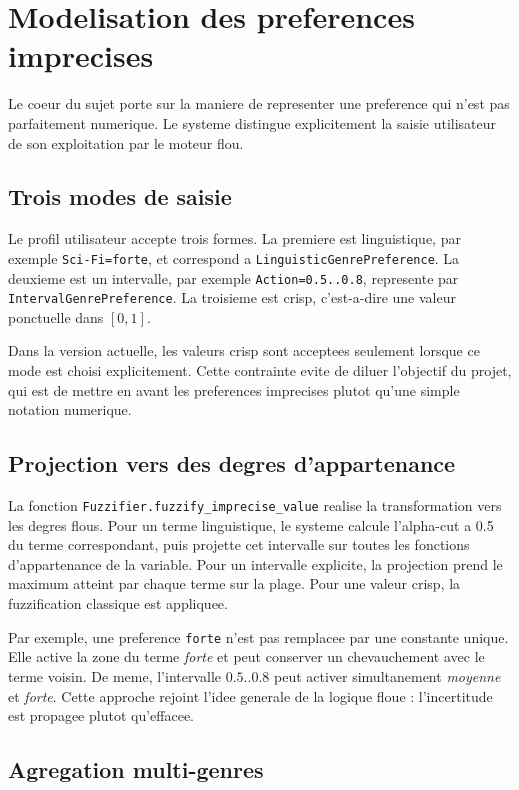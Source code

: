 \section{Modelisation des preferences imprecises}

Le coeur du sujet porte sur la maniere de representer une preference qui n'est pas parfaitement numerique. Le systeme distingue explicitement la saisie utilisateur de son exploitation par le moteur flou.

\subsection{Trois modes de saisie}

Le profil utilisateur accepte trois formes. La premiere est linguistique, par exemple \texttt{Sci-Fi=forte}, et correspond a \texttt{LinguisticGenrePreference}. La deuxieme est un intervalle, par exemple \texttt{Action=0.5..0.8}, represente par \texttt{IntervalGenrePreference}. La troisieme est crisp, c'est-a-dire une valeur ponctuelle dans $[0,1]$.

Dans la version actuelle, les valeurs crisp sont acceptees seulement lorsque ce mode est choisi explicitement. Cette contrainte evite de diluer l'objectif du projet, qui est de mettre en avant les preferences imprecises plutot qu'une simple notation numerique.

\subsection{Projection vers des degres d'appartenance}

La fonction \texttt{Fuzzifier.fuzzify\_imprecise\_value} realise la transformation vers les degres flous. Pour un terme linguistique, le systeme calcule l'alpha-cut a 0.5 du terme correspondant, puis projette cet intervalle sur toutes les fonctions d'appartenance de la variable. Pour un intervalle explicite, la projection prend le maximum atteint par chaque terme sur la plage. Pour une valeur crisp, la fuzzification classique est appliquee.

Par exemple, une preference \texttt{forte} n'est pas remplacee par une constante unique. Elle active la zone du terme \emph{forte} et peut conserver un chevauchement avec le terme voisin. De meme, l'intervalle $0.5..0.8$ peut activer simultanement \emph{moyenne} et \emph{forte}. Cette approche rejoint l'idee generale de la logique floue : l'incertitude est propagee plutot qu'effacee.

\subsection{Agregation multi-genres}

